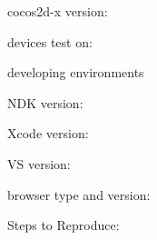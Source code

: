 
\begin{DoxyItemize}
\item cocos2d-\/x version\+:
\item devices test on\+:
\item developing environments
\begin{DoxyItemize}
\item N\+DK version\+:
\item Xcode version\+:
\item VS version\+:
\item browser type and version\+:
\end{DoxyItemize}
\end{DoxyItemize}

Steps to Reproduce\+:


\begin{DoxyEnumerate}
\item 
\item 
\end{DoxyEnumerate}
